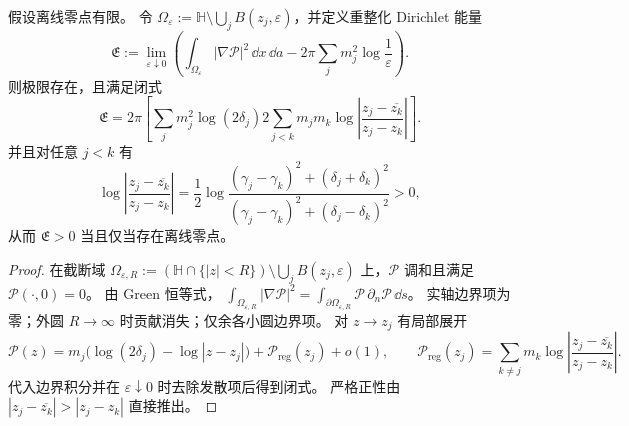\begin{theorem}\label{thm:xi-offline-green-renormalized-dirichlet-energy}
假设离线零点有限。
令 \(\Omega_\varepsilon:=\mathbb H\setminus\bigcup_j B(z_j,\varepsilon)\)，并定义重整化 Dirichlet 能量
\[
\mathfrak E:=
\lim_{\varepsilon\downarrow 0}\left(
\int_{\Omega_\varepsilon}|\nabla\mathcal P|^2\,\dd x\,\dd a
-2\pi\sum_j m_j^2\log\frac1\varepsilon
\right).
\]
则极限存在，且满足闭式
\[
\mathfrak E
=2\pi\left[
\sum_j m_j^2\log(2\delta_j)
2\sum_{j<k}m_jm_k\log\left|\frac{z_j-\overline{z_k}}{z_j-z_k}\right|
\right].
\]
并且对任意 \(j<k\) 有
\[
\log\left|\frac{z_j-\overline{z_k}}{z_j-z_k}\right|
=\frac12\log\frac{(\gamma_j-\gamma_k)^2+(\delta_j+\delta_k)^2}{(\gamma_j-\gamma_k)^2+(\delta_j-\delta_k)^2}>0,
\]
从而 \(\mathfrak E>0\) 当且仅当存在离线零点。
\end{theorem}
\begin{proof}
在截断域 \(\Omega_{\varepsilon,R}:=(\mathbb H\cap\{|z|<R\})\setminus\bigcup_jB(z_j,\varepsilon)\) 上，\(\mathcal P\) 调和且满足 \(\mathcal P(\cdot,0)=0\)。
由 Green 恒等式，
\(
\int_{\Omega_{\varepsilon,R}}|\nabla\mathcal P|^2=\int_{\partial\Omega_{\varepsilon,R}}\mathcal P\,\partial_n\mathcal P\,\dd s
\)。
实轴边界项为零；外圆 \(R\to\infty\) 时贡献消失；仅余各小圆边界项。
对 \(z\to z_j\) 有局部展开
\[
\mathcal P(z)=m_j\bigl(\log(2\delta_j)-\log|z-z_j|\bigr)+\mathcal P_{\mathrm{reg}}(z_j)+o(1),
\qquad
\mathcal P_{\mathrm{reg}}(z_j)=\sum_{k\neq j}m_k\log\left|\frac{z_j-\overline{z_k}}{z_j-z_k}\right|.
\]
代入边界积分并在 \(\varepsilon\downarrow 0\) 时去除发散项后得到闭式。
严格正性由 \(|z_j-\overline{z_k}|>|z_j-z_k|\) 直接推出。
\end{proof}

